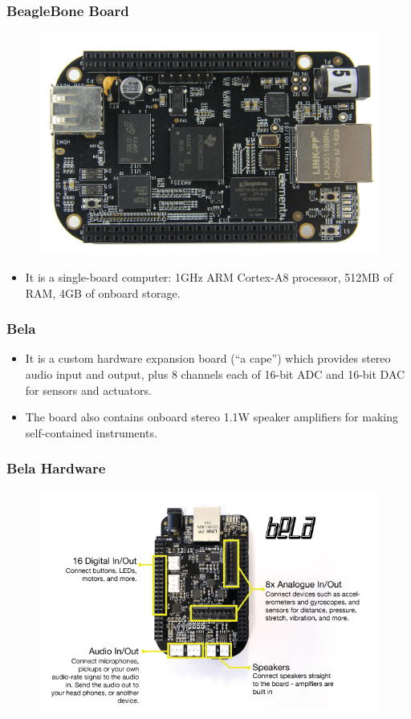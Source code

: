 \documentclass[screen, aspectratio=169]{beamer}
\begin{document}
\begin{frame}
  \frametitle{BeagleBone Board}
         \begin{figure}
	\includegraphics[scale=0.2]{img/beagleboneboard.png}
	\end{figure}
  \begin{itemize}
\item It is a single-board computer: 1GHz ARM Cortex-A8 processor, 512MB of RAM, 4GB of onboard storage.
\end{itemize}
\end{frame}
%
\begin{frame}
  \frametitle{Bela}
 \begin{itemize}
\item It is a custom hardware expansion board (``a cape'')  which provides stereo audio input and output, plus 8 channels each of 16-bit ADC and 16-bit DAC for sensors and actuators.
\item The board also contains onboard stereo 1.1W speaker amplifiers for making self-contained instruments.
\end{itemize}
\end{frame}
%
\begin{frame}
  \frametitle{Bela Hardware}
     \begin{figure}
	\includegraphics[scale=0.5]{img/bela-hardware.png}
\end{figure}
\end{frame}
\end{document}
